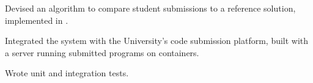 \begin{cventries}
{\begin{cvitems}
		\item Devised an algorithm to compare student submissions to a reference solution, implemented in .
		\item Integrated the system with the University's code submission platform, built with a  server running submitted programs on  containers.
		\item Wrote unit and integration tests.
		\end{cvitems}
	}
\end{cventries}
